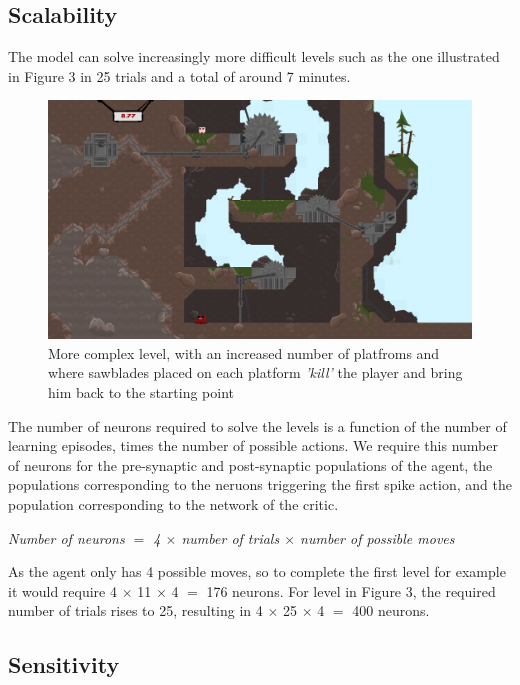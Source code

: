 \documentclass[10pt]{article}
\begin{document}
    \subsection{Scalability}

    The model can solve increasingly more difficult levels such as the one illustrated in Figure 3 in 25 trials and a total of around 7 minutes.

    \begin{figure}[ht!]
    \centering
    \includegraphics[width=155mm]{./bladeLevel.png}
    \caption{More complex level, with an increased number of platfroms and where sawblades placed on each platform \textit{'kill'} the player and bring him back to the starting point \label{overflow}}
    \end{figure}

    The number of neurons required to solve the levels is a function of the number of learning episodes, times the number of possible actions. We require this number of neurons for the pre-synaptic and post-synaptic populations of the agent, the populations corresponding to the neruons triggering the first spike action, and the population corresponding to the network of the critic.
    
    \begin{center}
        \textit{Number of neurons $=$ 4 $\times$ number of trials $\times$ number of possible moves}
    \end{center}

    As the agent only has 4 possible moves, so to complete the first level for example it would require 4 $\times$ 11 $\times$ 4 $=$ 176 neurons. For level in Figure 3, the required number of trials rises to 25, resulting in 4 $\times$ 25 $\times$ 4 $=$ 400 neurons.

    \subsection{Sensitivity}
\end{document}
